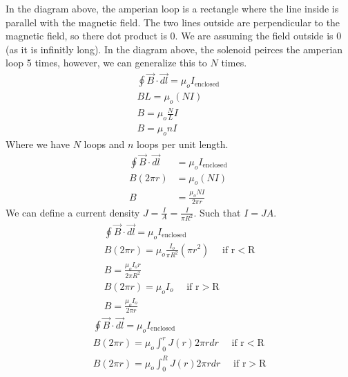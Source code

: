 \documentclass{article}
\begin{document}
\sol
{}
In the diagram above, the amperian loop is a rectangle where the line inside is parallel with the magnetic field.
The two lines outside are perpendicular to the magnetic field, so there dot product is 0. We are assuming the field outside is 0 (as it is infinitly long).
In the diagram above, the solenoid peirces the amperian loop 5 times, however, we can generalize this to $N$ times.
$$
\begin{gathered}
\oint \vec{B} \cdot \overrightarrow{d l}=\mu_o I_{\text {enclosed }} \\
B L=\mu_o(N I) \\
B=\mu_o \frac{N}{L} I \\
B=\mu_o n I
\end{gathered}
$$
Where we have $N$ loops and $n$ loops per unit length.
\sol
{}
$$
\begin{aligned}
\oint \vec{B} \cdot \overrightarrow{d l} & =\mu_o I_{\text {enclosed }} \\
B(2 \pi r) & =\mu_o(N I) \\
B & =\frac{\mu_o N I}{2 \pi r}
\end{aligned}
$$
\sol
{}
We can define a current density $J = \frac{I}{A} = \frac{I}{\pi R^2}$. Such that $I = JA$.
$$
\begin{gathered}
\oint \vec{B} \cdot \overrightarrow{d l}=\mu_o I_{\text {enclosed }} \\
B(2 \pi r)=\mu_o \frac{I_o}{\pi R^2}\left(\pi r^2\right) \quad \text { if } \mathrm{r}<\mathrm{R} \\
B = \frac{\mu_o I_o r}{2 \pi R^2} \\
B(2 \pi r)=\mu_o I_o \quad \text { if } \mathrm{r}>\mathrm{R} \\
B = \frac{\mu_o I_o}{2 \pi r}
\end{gathered}
$$
\newpage
{}
\sol
$$
\begin{gathered}
\oint \vec{B} \cdot \overrightarrow{d l}=\mu_o I_{\text {enclosed }} \\
B(2 \pi r)=\mu_o \int_0^r J(r) 2 \pi r d r \quad \text { if } \mathrm{r}<\mathrm{R} \\
B(2 \pi r)=\mu_o \int_0^R J(r) 2 \pi r d r \quad \text { if } \mathrm{r}>\mathrm{R}
\end{gathered}
$$
\end{document}
